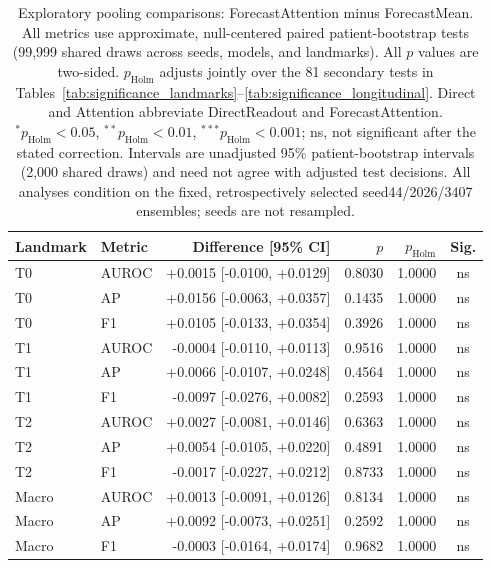 \begin{table}[t]
\centering
\small
\caption{Exploratory pooling comparisons: ForecastAttention minus ForecastMean. All metrics use approximate, null-centered paired patient-bootstrap tests (99,999 shared draws across seeds, models, and landmarks). All $p$ values are two-sided. $p_{\mathrm{Holm}}$ adjusts jointly over the 81 secondary tests in Tables~\ref{tab:significance_landmarks}--\ref{tab:significance_longitudinal}. Direct and Attention abbreviate DirectReadout and ForecastAttention. $^{*}p_{\mathrm{Holm}}<0.05$, $^{**}p_{\mathrm{Holm}}<0.01$, $^{***}p_{\mathrm{Holm}}<0.001$; ns, not significant after the stated correction. Intervals are unadjusted 95\% patient-bootstrap intervals (2,000 shared draws) and need not agree with adjusted test decisions. All analyses condition on the fixed, retrospectively selected seed44/2026/3407 ensembles; seeds are not resampled.}
\label{tab:significance_pooling}
\begin{tabular}{llrrrc}
\toprule
Landmark & Metric & Difference [95\% CI] & $p$ & $p_{\mathrm{Holm}}$ & Sig. \\
\midrule
T0 & AUROC & +0.0015 [-0.0100, +0.0129] & 0.8030 & 1.0000 & ns \\
T0 & AP & +0.0156 [-0.0063, +0.0357] & 0.1435 & 1.0000 & ns \\
T0 & F1 & +0.0105 [-0.0133, +0.0354] & 0.3926 & 1.0000 & ns \\
T1 & AUROC & -0.0004 [-0.0110, +0.0113] & 0.9516 & 1.0000 & ns \\
T1 & AP & +0.0066 [-0.0107, +0.0248] & 0.4564 & 1.0000 & ns \\
T1 & F1 & -0.0097 [-0.0276, +0.0082] & 0.2593 & 1.0000 & ns \\
T2 & AUROC & +0.0027 [-0.0081, +0.0146] & 0.6363 & 1.0000 & ns \\
T2 & AP & +0.0054 [-0.0105, +0.0220] & 0.4891 & 1.0000 & ns \\
T2 & F1 & -0.0017 [-0.0227, +0.0212] & 0.8733 & 1.0000 & ns \\
Macro & AUROC & +0.0013 [-0.0091, +0.0126] & 0.8134 & 1.0000 & ns \\
Macro & AP & +0.0092 [-0.0073, +0.0251] & 0.2592 & 1.0000 & ns \\
Macro & F1 & -0.0003 [-0.0164, +0.0174] & 0.9682 & 1.0000 & ns \\
\bottomrule
\end{tabular}
\end{table}
